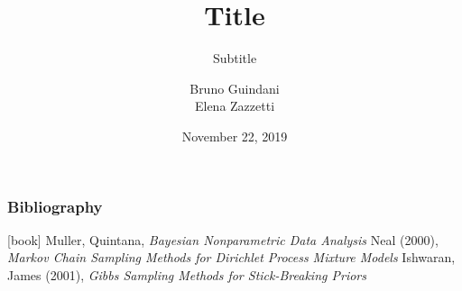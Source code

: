 \documentclass{beamer}
\title[Short title]{Title} %
\subtitle{Subtitle}
\author[Guindani, Zazzetti]{Bruno Guindani \\ Elena Zazzetti}
\institute[PoliMi]{\texttt{[image: ../etc/logo\_long.jpg]}}
\date[2019/11/22]{November 22, 2019}
\begin{document}





\begin{frame} %
	\frametitle{Bibliography}
	\begin{thebibliography}{9}
		 Muller, Quintana, \textit{Bayesian Nonparametric Data Analysis}
		 Neal (2000), \textit{Markov Chain Sampling Methods for Dirichlet Process Mixture Models}
		 Ishwaran, James (2001), \textit{Gibbs Sampling Methods for Stick-Breaking Priors}	
	\end{thebibliography}
\end{frame}
\end{document}
